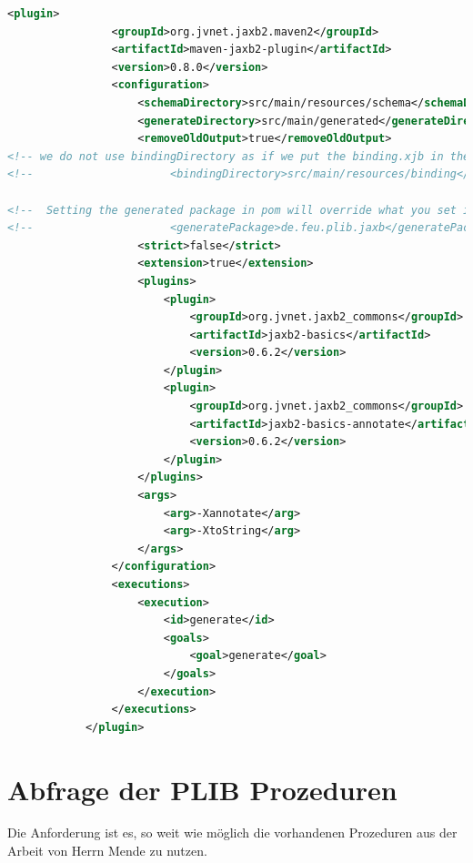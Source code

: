 \begin{lstlisting}[caption=JAXB Maven Plugin, language=XML, label=lst:jaxbplugin]
            <plugin>
                <groupId>org.jvnet.jaxb2.maven2</groupId>
                <artifactId>maven-jaxb2-plugin</artifactId>
                <version>0.8.0</version>
                <configuration>
                    <schemaDirectory>src/main/resources/schema</schemaDirectory>
                    <generateDirectory>src/main/generated</generateDirectory>
                    <removeOldOutput>true</removeOldOutput>
<!-- we do not use bindingDirectory as if we put the binding.xjb in the schema directory it will be taken -->
<!--                     <bindingDirectory>src/main/resources/binding</bindingDirectory> -->

<!--  Setting the generated package in pom will override what you set in binding.xjb file, thus commented out -->
<!--                     <generatePackage>de.feu.plib.jaxb</generatePackage> -->
                    <strict>false</strict>
                    <extension>true</extension>
                    <plugins>
                        <plugin>
                            <groupId>org.jvnet.jaxb2_commons</groupId>
                            <artifactId>jaxb2-basics</artifactId>
                            <version>0.6.2</version>
                        </plugin>
                        <plugin>
                            <groupId>org.jvnet.jaxb2_commons</groupId>
                            <artifactId>jaxb2-basics-annotate</artifactId>
                            <version>0.6.2</version>
                        </plugin>
                    </plugins>
                    <args>
                        <arg>-Xannotate</arg>
                        <arg>-XtoString</arg>
                    </args>
                </configuration>
                <executions>
                    <execution>
                        <id>generate</id>
                        <goals>
                            <goal>generate</goal>
                        </goals>
                    </execution>
                </executions>
            </plugin>    
\end{lstlisting}

\section{Abfrage der PLIB Prozeduren}\label{sec:abfrage_plib_prozeduren}

Die Anforderung ist es, so weit wie möglich die vorhandenen Prozeduren aus der Arbeit von Herrn Mende zu nutzen. 

